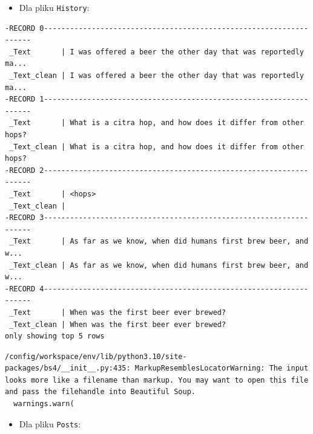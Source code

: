 \documentclass[
  letterpaper,
  DIV=11,
  numbers=noendperiod]{scrreprt}
\providecommand{\tightlist}{%
  \setlength{\itemsep}{0pt}\setlength{\parskip}{0pt}}\usepackage{longtable,booktabs,array}
\begin{document}
\normalsize

\begin{itemize}
\tightlist
\item
  Dla pliku \texttt{History}: \small
\end{itemize}

\begin{verbatim}
-RECORD 0-------------------------------------------------------------------
 _Text       | I was offered a beer the other day that was reportedly ma... 
 _Text_clean | I was offered a beer the other day that was reportedly ma... 
-RECORD 1-------------------------------------------------------------------
 _Text       | What is a citra hop, and how does it differ from other hops? 
 _Text_clean | What is a citra hop, and how does it differ from other hops? 
-RECORD 2-------------------------------------------------------------------
 _Text       | <hops>                                                       
 _Text_clean |                                                              
-RECORD 3-------------------------------------------------------------------
 _Text       | As far as we know, when did humans first brew beer, and w... 
 _Text_clean | As far as we know, when did humans first brew beer, and w... 
-RECORD 4-------------------------------------------------------------------
 _Text       | When was the first beer ever brewed?                         
 _Text_clean | When was the first beer ever brewed?                         
only showing top 5 rows
\end{verbatim}

\begin{verbatim}
/config/workspace/env/lib/python3.10/site-packages/bs4/__init__.py:435: MarkupResemblesLocatorWarning: The input looks more like a filename than markup. You may want to open this file and pass the filehandle into Beautiful Soup.
  warnings.warn(
\end{verbatim}

\normalsize

\begin{itemize}
\tightlist
\item
  Dla pliku \texttt{Posts}: \small
\end{itemize}
\end{document}
